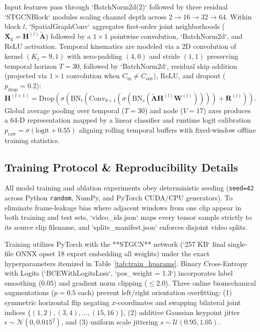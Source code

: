 \documentclass[conference]{IEEEtran}
\begin{document}
Input features pass through `BatchNorm2d(2)` followed by three residual `STGCNBlock` modules scaling channel depth across $2 \rightarrow 16 \rightarrow 32 \rightarrow 64$. Within block $l$, `SpatialGraphConv` aggregates first-order joint neighborhoods ($\mathbf{X}_{\text{g}} = \mathbf{H}^{(l)}\tilde{\mathbf{A}}$) followed by a $1 \times 1$ pointwise convolution, `BatchNorm2d`, and ReLU activation. Temporal kinematics are modeled via a 2D convolution of kernel $(K_t=9, 1)$ with zero-padding $(4, 0)$ and stride $(1, 1)$ preserving temporal horizon $T=30$, followed by `BatchNorm2d`, residual skip addition (projected via $1 \times 1$ convolution when $C_{\text{in}} \neq C_{\text{out}}$), ReLU, and dropout ($p_{\text{drop}} = 0.2$):
\begin{equation}
\mathbf{H}^{(l+1)} = \text{Drop}\!\left(\sigma\!\left(\text{BN}_t\!\left(\text{Conv}_{9\times 1}\!\left(\sigma\!\left(\text{BN}_s\!\left(\tilde{\mathbf{A}}\mathbf{H}^{(l)}\mathbf{W}^{(l)}\right)\right)\right)\right) + \mathbf{R}^{(l)}\right)\right).
\end{equation}
Global average pooling over temporal ($T=30$) and node ($V=17$) axes produces a 64-D representation mapped by a linear classifier and runtime logit calibration $p_{\text{raw}} = \sigma(\text{logit} + 0.55)$ aligning rolling temporal buffers with fixed-window offline training statistics.

\subsection{Training Protocol & Reproducibility Details}
All model training and ablation experiments obey deterministic seeding (\texttt{seed=42} across Python \texttt{random}, NumPy, and PyTorch CUDA/CPU generators). To eliminate frame-leakage bias where adjacent windows from one clip appear in both training and test sets, `video_ids.json` maps every tensor sample strictly to its source clip filename, and `splits_manifest.json` enforces disjoint video splits.

Training utilizes PyTorch with the **STGCN** network (`257 KB` final single-file ONNX opset 18 export embedding all weights) under the exact hyperparameters itemized in Table~\ref{tab:train_hparams}. Binary Cross-Entropy with Logits (`BCEWithLogitsLoss`, `pos_weight = 1.3`) incorporates label smoothing ($0.05$) and gradient norm clipping ($\le 2.0$). Three online biomechanical augmentations ($p = 0.5$ each) prevent left/right orientation overfitting: (1) symmetric horizontal flip negating $x$-coordinates and swapping bilateral joint indices $\{(1,2), (3,4), \dots, (15,16)\}$, (2) additive Gaussian keypoint jitter $\epsilon \sim \mathcal{N}(0, 0.015^2)$, and (3) uniform scale jittering $s \sim \mathcal{U}(0.95, 1.05)$.
\end{document}
